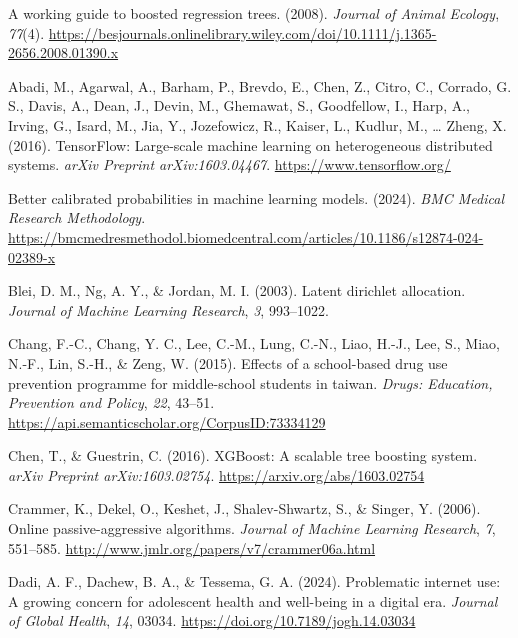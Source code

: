 \documentclass[
  titlepage]{article}
\newlength{\cslhangindent}
\newenvironment{CSLReferences}[2] %
 {\begin{list}{}{%
  \setlength{\itemindent}{0pt}
  \setlength{\leftmargin}{0pt}
  \setlength{\parsep}{0pt}
  \ifodd #1
   \setlength{\leftmargin}{\cslhangindent}
   \setlength{\itemindent}{-1\cslhangindent}
  \fi
  \setlength{\itemsep}{#2\baselineskip}}}
 {\end{list}}
\begin{document}
\label{refs}
\begin{CSLReferences}{1}{0}
A working guide to boosted regression trees. (2008). \emph{Journal of
Animal Ecology}, \emph{77}(4).
\url{https://besjournals.onlinelibrary.wiley.com/doi/10.1111/j.1365-2656.2008.01390.x}

Abadi, M., Agarwal, A., Barham, P., Brevdo, E., Chen, Z., Citro, C.,
Corrado, G. S., Davis, A., Dean, J., Devin, M., Ghemawat, S.,
Goodfellow, I., Harp, A., Irving, G., Isard, M., Jia, Y., Jozefowicz,
R., Kaiser, L., Kudlur, M., \ldots{} Zheng, X. (2016). TensorFlow:
Large-scale machine learning on heterogeneous distributed systems.
\emph{arXiv Preprint arXiv:1603.04467}.
\url{https://www.tensorflow.org/}

Better calibrated probabilities in machine learning models. (2024).
\emph{BMC Medical Research Methodology}.
\url{https://bmcmedresmethodol.biomedcentral.com/articles/10.1186/s12874-024-02389-x}

Blei, D. M., Ng, A. Y., \& Jordan, M. I. (2003). Latent dirichlet
allocation. \emph{Journal of Machine Learning Research}, \emph{3},
993--1022.

Chang, F.-C., Chang, Y. C., Lee, C.-M., Lung, C.-N., Liao, H.-J., Lee,
S., Miao, N.-F., Lin, S.-H., \& Zeng, W. (2015). Effects of a
school-based drug use prevention programme for middle-school students in
taiwan. \emph{Drugs: Education, Prevention and Policy}, \emph{22},
43--51. \url{https://api.semanticscholar.org/CorpusID:73334129}

Chen, T., \& Guestrin, C. (2016). XGBoost: A scalable tree boosting
system. \emph{arXiv Preprint arXiv:1603.02754}.
\url{https://arxiv.org/abs/1603.02754}

Crammer, K., Dekel, O., Keshet, J., Shalev-Shwartz, S., \& Singer, Y.
(2006). Online passive-aggressive algorithms. \emph{Journal of Machine
Learning Research}, \emph{7}, 551--585.
\url{http://www.jmlr.org/papers/v7/crammer06a.html}

Dadi, A. F., Dachew, B. A., \& Tessema, G. A. (2024). Problematic
internet use: A growing concern for adolescent health and well-being in
a digital era. \emph{Journal of Global Health}, \emph{14}, 03034.
\url{https://doi.org/10.7189/jogh.14.03034}


\end{CSLReferences}
\end{document}
